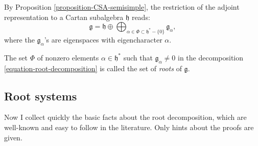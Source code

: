 By Proposition \ref{proposition-CSA-semisimple}, the restriction of the adjoint representation to a Cartan subalgebra $\mathfrak h$ reads:
\begin{equation}
 \label{equation-root-decomposition}\mathfrak g = \mathfrak h \oplus \bigoplus_{\alpha \in \Phi\subset \mathfrak h^* - \{0\}} \mathfrak g_\alpha,
\end{equation}
where the $\mathfrak g_\alpha$'s are eigenspaces with eigencharacter $\alpha$.


\begin{definition}
 \label{definition-roots}
The set $\Phi$ of nonzero elements $\alpha \in \mathfrak h^*$ such that $\mathfrak g_\alpha\ne 0$ in the decomposition \eqref{equation-root-decomposition} is called the set of {\it roots} of $\mathfrak g$.
\end{definition}


\subsection{Root systems}
\label{subsection-root-systems}


Now I collect quickly the basic facts about the root decomposition, which are well-known and easy to follow in the literature. Only hints about the proofs are given.

